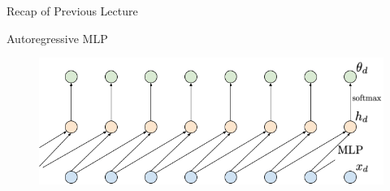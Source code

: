 \documentclass{beamer}
\begin{document}
\begin{frame}{Recap of Previous Lecture}
	\vspace{-0.2cm}
	\begin{block}{Autoregressive MLP}
		\vspace{-0.3cm}
 		\begin{figure}
		     \centering
		     \includegraphics[width=0.5\linewidth]{figs/sequential_MLP}
		 \end{figure}
	\end{block}
	\vspace{-0.4cm}


\end{frame}
\end{document}
